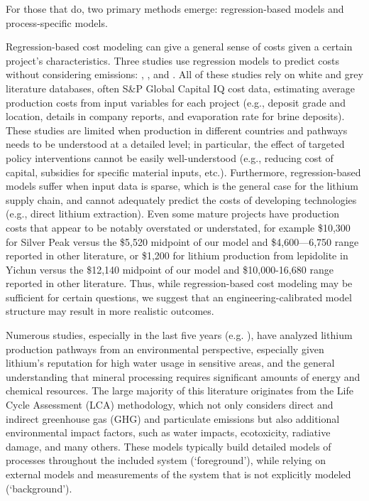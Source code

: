 \documentclass{article}
\renewcommand\_{\textunderscore\allowbreak}
\begin{document}
For those that do, two primary methods emerge: regression-based models and process-specific models.

Regression-based cost modeling can give a general sense of costs given a certain project's characteristics. Three studies use regression models to predict costs without considering emissions: \citet{ambroseUnderstandingFutureLithium2020a}, \citet{flemingLongrunAvailabilityMineral2024}, and \citet{zhouImplicationsUncertaintiesGlobal2026}. All of these studies rely on white and grey literature databases, often S\&P Global Capital IQ cost data, estimating average production costs from input variables for each project (e.g., deposit grade and location, details in company reports, and evaporation rate for brine deposits). These studies are limited when production in different countries and pathways needs to be understood at a detailed level; in particular, the effect of targeted policy interventions cannot be easily well-understood (e.g., reducing cost of capital, subsidies for specific material inputs, etc.). Furthermore, regression-based models suffer when input data is sparse, which is the general case for the lithium supply chain, and cannot adequately predict the costs of developing technologies (e.g., direct lithium extraction). Even some mature projects have production costs that appear to be notably overstated or understated, for example \$10,300 for Silver Peak \cite{zhouImplicationsUncertaintiesGlobal2026, ambroseUnderstandingFutureLithium2020a} versus the \$5,520 midpoint of our model and \$4,600---6,750 range reported in other literature, or \$1,200 for lithium production from lepidolite in Yichun versus the \$12,140 midpoint of our model and \$10,000-16,680 range reported in other literature. Thus, while regression-based cost modeling may be sufficient for certain questions, we suggest that an engineering-calibrated model structure may result in more realistic outcomes. 

Numerous studies, especially in the last five years (e.g. \cite{chordiaLifeCycleEnvironmental2022, schenkerLithiumGeothermalBrines2024, khakmardanComparativeLifeCycle2023, iyerLifecycleAnalysisLithium2024, kellyEnergyGreenhouseGas2021, mousavinezhadEnvironmentalImpactAssessment2024, jiangEnvironmentalImpactsLithium2020, nikfarUnlockingSustainableLithium2025}), have analyzed lithium production pathways from an environmental perspective, especially given lithium's reputation for high water usage in sensitive areas, and the general understanding that mineral processing requires significant amounts of energy and chemical resources. The large majority of this literature originates from the Life Cycle Assessment (LCA) methodology, which not only considers direct and indirect greenhouse gas (GHG) and particulate emissions but also additional environmental impact factors, such as water impacts, ecotoxicity, radiative damage, and many others. These models typically build detailed models of processes throughout the included system (`foreground'), while relying on external models and measurements of the system that is not explicitly modeled (`background').
\end{document}
